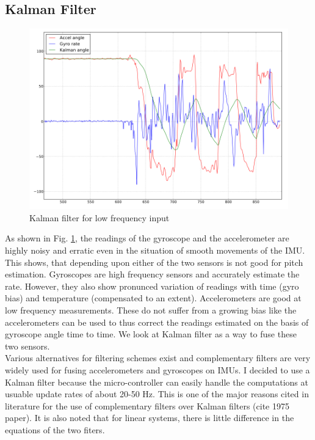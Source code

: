 \subsection{Kalman Filter}
\begin{figure}[!h]
\centering
\includegraphics[scale=1.8]{fig/kalman_lowfreq.pdf}
\caption{Kalman filter for low frequency input}
\label{fig:5_kalman_lowfreq}
\end{figure}
As shown in Fig. \ref{fig:5_kalman_lowfreq}, the readings of the gyroscope and the accelerometer are highly noisy and erratic even
in the situation of smooth movements of the IMU. This shows, that depending upon either of the two sensors is not good for
pitch estimation. Gyroscopes are high frequency sensors and accurately estimate the rate. However, they also show pronunced
variation of 
readings with time (gyro bias) and temperature (compensated to an extent). Accelerometers are good at low frequency
measurements. These do not suffer from a growing bias like the accelerometers can be used to thus correct the
readings estimated on the basis of gyroscope angle time to time. We look at Kalman filter as a way to fuse these two sensors.\\

Various alternatives for filtering schemes exist and complementary filters are very widely used for fusing accelerometers and 
gyroscopes on IMUs. I decided to use a Kalman filter because the micro-controller can easily handle the computations
at usuable update rates of about 20-50 Hz. This is one of the major reasons cited in literature for the use of complementary
filters over Kalman filters (cite 1975 paper). It is also noted that for linear systems, there is little difference in the equations
of the two fiters.\\

